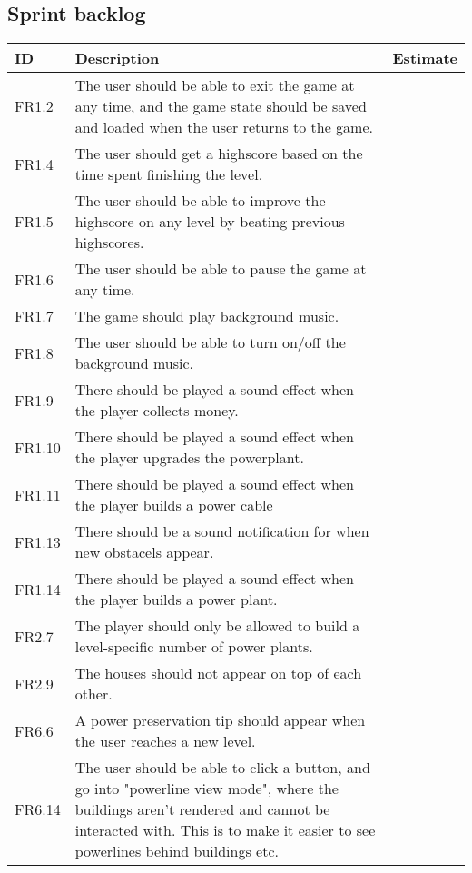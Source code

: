\subsection{Sprint backlog}
	\begin{tabular}{| p{1.2cm} | p{8cm} | p{3cm} |}
		\hline
		\rowcolor{gray}
		ID & Description & Estimate \\ \hline
		FR1.2 &  The user should be able to exit the game at any time, and the game state should be saved and loaded when the user returns to the game. & \\ \hline

		FR1.4 & The user should get a highscore based on the time spent finishing the level. & \\ \hline

		FR1.5 & The user should be able to improve the highscore on any level by beating previous highscores. & \\ \hline

		FR1.6 & The user should be able to pause the game at any time. & \\ \hline

		FR1.7 & The game should play background music. & \\ \hline

		FR1.8 & The user should be able to turn on/off the background music. & \\ \hline

		FR1.9 & There should be played a sound effect when the player collects money. & \\ \hline

		FR1.10 & There should be played a sound effect when the player upgrades the powerplant. & \\ \hline

		FR1.11 & There should be played a sound effect when the player builds a power cable & \\ \hline

		FR1.13 & There should be a sound notification for when new obstacels appear. & \\ \hline

		FR1.14 & There should be played a sound effect when the player builds a power plant. & \\ \hline

		FR2.7 & The player should only be allowed to build a level-specific number of power plants. & \\ \hline

		FR2.9 & The houses should not appear on top of each other. & \\ \hline
		
		FR6.6 & A power preservation tip should appear when the user reaches a new level. & \\ \hline

		FR6.14 & The user should be able to click a button, and go into "powerline view mode", where the buildings aren't rendered and cannot be interacted with. This is to make it easier to see powerlines behind buildings etc. & \\ \hline
	\end{tabular}

